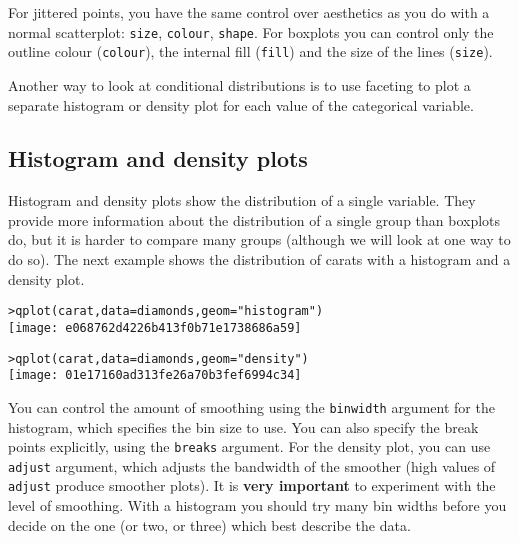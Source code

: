 % 
For jittered points, you have the same control over aesthetics as you do with a normal scatterplot: {\tt size}, {\tt colour}, {\tt shape}.  For boxplots you can control only the outline colour ({\tt colour}), the internal fill ({\tt fill}) and the size of the lines ({\tt size}).

Another way to look at conditional distributions is to use faceting to plot a separate histogram or density plot for each value of the categorical variable.

\subsection{Histogram and density plots}\label{sub:density}

Histogram and density plots show the distribution of a single variable.  They provide more information about the distribution of a single group than boxplots do, but it is harder to compare many groups (although we will look at one way to do so).  The next example shows the distribution of carats with a histogram and a density plot.

\begin{alltt}
> qplot(carat, data = diamonds, geom = "histogram")
\texttt{[image: e068762d4226b413f0b71e1738686a59]}

> qplot(carat, data = diamonds, geom = "density")
\texttt{[image: 01e17160ad313fe26a70b3fef6994c34]}

\end{alltt}

You can control the amount of smoothing using the {\tt binwidth} argument for the histogram, which specifies the bin size to use.  You can also specify the break points explicitly, using the {\tt breaks} argument.  For the density plot, you can use {\tt adjust} argument, which adjusts the bandwidth of the smoother (high values of {\tt adjust} produce smoother plots).  It is {\bf very important} to experiment with the level of smoothing.  With a histogram you should try many bin widths before you decide on the one (or two, or three) which best describe the data.

